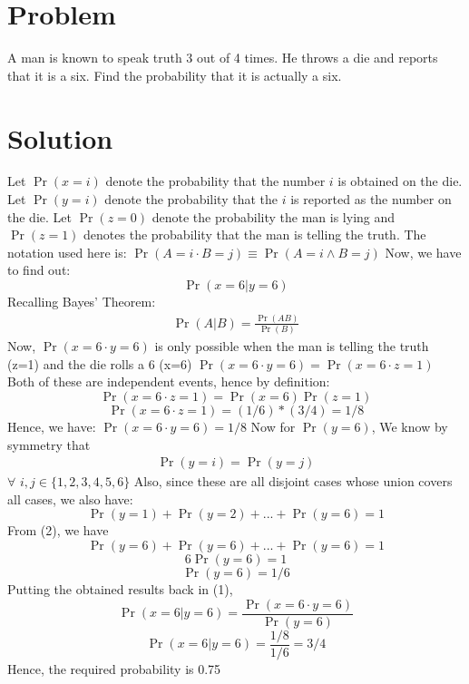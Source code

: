 \documentclass[journal,12pt,twocolumn]{IEEEtran}
\begin{document}
\section*{Problem}
A man is known to speak truth 3 out of 4 times. He throws a die and reports that it is a six. Find the probability that it is actually a six.
\section*{Solution}
Let $\Pr(x=i)$ denote the probability that the number $i$ is obtained on the die.
\newline Let $\Pr(y=i)$ denote the probability that the $i$ is reported as the number on the die.
\newline Let $\Pr(z=0)$ denote the probability the man is lying and $\Pr(z=1)$ denotes the probability that the man is telling the truth.
\newline \newline The notation used here is:
\newline $\Pr(A=i\cdot B=j)\equiv \Pr(A=i \land B=j)$
\newline \newline Now, we have to find out: $$\Pr(x=6|y=6)$$
Recalling Bayes' Theorem: 
\begin{eqnarray}
   \Pr(A|B)=\frac{\Pr(AB)}{\Pr(B)}    
\end{eqnarray}
\newline Now, $\Pr(x=6 \cdot y=6)$ is only possible when the man is telling the truth (z=1) and the die rolls a 6 (x=6)
\newline $\Pr(x=6 \cdot y=6)=\Pr(x=6 \cdot z=1)$
\newline Both of these are independent events, hence by definition:
$$\Pr(x=6 \cdot z=1)=\Pr(x=6)\Pr(z=1) $$
$$\Pr(x=6 \cdot z=1)=(1/6)*(3/4)=1/8 $$
Hence, we have: 
\newline $\Pr(x=6 \cdot y=6)=1/8 $
\newline \newline Now for $\Pr(y=6)$,
\newline We know by symmetry that 
\begin{eqnarray}
   \Pr(y=i) = \Pr(y=j)
\end{eqnarray}
$\forall$ $i,j \in \{ 1,2,3,4,5,6 \}$ 
\newline \newline Also, since these are all disjoint cases whose union covers all cases, we also have:
\newline $$ \Pr(y=1)+\Pr(y=2)+...+\Pr(y=6) = 1 $$
\newline From (2), we have 
$$ \Pr(y=6)+\Pr(y=6)+...+\Pr(y=6) = 1 $$
$$ 6\Pr(y=6) = 1 $$
$$ \Pr(y=6) = 1/6 $$
Putting the obtained results back in (1),
$$\Pr(x=6|y=6) = \frac{\Pr(x=6 \cdot y=6)}{\Pr(y=6)} $$
$$\Pr(x=6|y=6) = \frac{1/8}{1/6} = 3/4$$
Hence, the required probability is 0.75
\end{document}

